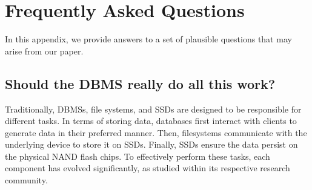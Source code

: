 \section{Frequently Asked Questions}\label{sec:appendix}
In this appendix, we provide answers to a set of plausible questions that may arise from our paper.

\subsection{Should the DBMS really do all this work?}\label{sec:q1}

Traditionally, DBMSs, file systems, and SSDs are designed to be responsible for different tasks.
In terms of storing data, databases first interact with clients to generate data in their preferred manner.
Then, filesystems communicate with the underlying device to store it on SSDs.
Finally, SSDs ensure the data persist on the physical NAND flash chips.
To effectively perform these tasks, each component has evolved significantly, as studied within its respective research community.


